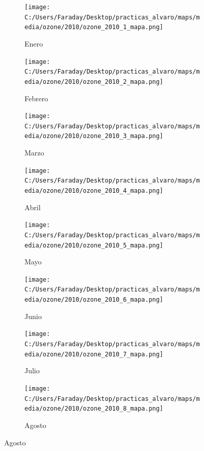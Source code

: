 \documentclass[12pt]{beamer}
\begin{document}
\begin{frame}[squeeze]
\tiny
\begin{figure}[H]
\centering
\begin{subfigure}[H]{0.20\textwidth}
\texttt{[image: C:/Users/Faraday/Desktop/practicas\_alvaro/maps/media/ozone/2010/ozone\_2010\_1\_mapa.png]}
\captionsetup{labelformat=empty}
\caption{\scriptsize Enero}
\label{fig:map-ozone-2010-1}
\end{subfigure}
%
\begin{subfigure}[H]{0.20\textwidth}
\texttt{[image: C:/Users/Faraday/Desktop/practicas\_alvaro/maps/media/ozone/2010/ozone\_2010\_2\_mapa.png]}
\captionsetup{labelformat=empty}
\caption{\scriptsize Febrero}
\label{fig:map-ozone-2010-2}
\end{subfigure}
%
\begin{subfigure}[H]{0.20\textwidth}
\texttt{[image: C:/Users/Faraday/Desktop/practicas\_alvaro/maps/media/ozone/2010/ozone\_2010\_3\_mapa.png]}
\captionsetup{labelformat=empty}
\caption{\scriptsize Marzo}
\label{fig:map-ozone-2010-3}
\end{subfigure}
%
\begin{subfigure}[H]{0.20\textwidth}
\texttt{[image: C:/Users/Faraday/Desktop/practicas\_alvaro/maps/media/ozone/2010/ozone\_2010\_4\_mapa.png]}
\captionsetup{labelformat=empty}
\caption{\scriptsize Abril}
\label{fig:map-ozone-2010-4}
\end{subfigure}

\begin{subfigure}[H]{0.20\textwidth}
\texttt{[image: C:/Users/Faraday/Desktop/practicas\_alvaro/maps/media/ozone/2010/ozone\_2010\_5\_mapa.png]}
\captionsetup{labelformat=empty}
\caption{\scriptsize Mayo}
\label{fig:map-ozone-2010-5}
\end{subfigure}
%
\begin{subfigure}[H]{0.20\textwidth}
\texttt{[image: C:/Users/Faraday/Desktop/practicas\_alvaro/maps/media/ozone/2010/ozone\_2010\_6\_mapa.png]}
\captionsetup{labelformat=empty}
\caption{\scriptsize Junio}
\label{fig:map-ozone-2010-6}
\end{subfigure}
%
\begin{subfigure}[H]{0.20\textwidth}
\texttt{[image: C:/Users/Faraday/Desktop/practicas\_alvaro/maps/media/ozone/2010/ozone\_2010\_7\_mapa.png]}
\captionsetup{labelformat=empty}
\caption{\scriptsize Julio}
\label{fig:map-ozone-2010-7}
\end{subfigure}
%
\begin{subfigure}[H]{0.20\textwidth}
\texttt{[image: C:/Users/Faraday/Desktop/practicas\_alvaro/maps/media/ozone/2010/ozone\_2010\_8\_mapa.png]}
\captionsetup{labelformat=empty}
\caption{\scriptsize Agosto}
\label{fig:map-ozone-2010-8}
\end{subfigure}


\end{figure}
\end{frame}
\end{document}
